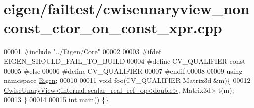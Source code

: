 \hypertarget{eigen_2failtest_2cwiseunaryview__nonconst__ctor__on__const__xpr_8cpp_source}{}\section{eigen/failtest/cwiseunaryview\+\_\+nonconst\+\_\+ctor\+\_\+on\+\_\+const\+\_\+xpr.cpp}
\label{eigen_2failtest_2cwiseunaryview__nonconst__ctor__on__const__xpr_8cpp_source}

\begin{DoxyCode}
00001 \textcolor{preprocessor}{#include "../Eigen/Core"}
00002 
00003 \textcolor{preprocessor}{#ifdef EIGEN\_SHOULD\_FAIL\_TO\_BUILD}
00004 \textcolor{preprocessor}{#define CV\_QUALIFIER const}
00005 \textcolor{preprocessor}{#else}
00006 \textcolor{preprocessor}{#define CV\_QUALIFIER}
00007 \textcolor{preprocessor}{#endif}
00008 
00009 \textcolor{keyword}{using namespace }\hyperlink{namespace_eigen}{Eigen};
00010 
00011 \textcolor{keywordtype}{void} foo(CV\_QUALIFIER Matrix3d &m)\{
00012     \hyperlink{group___core___module_class_eigen_1_1_cwise_unary_view}{CwiseUnaryView<internal::scalar\_real\_ref\_op<double>},
      Matrix3d> t(m);
00013 \}
00014 
00015 \textcolor{keywordtype}{int} main() \{\}
\end{DoxyCode}
